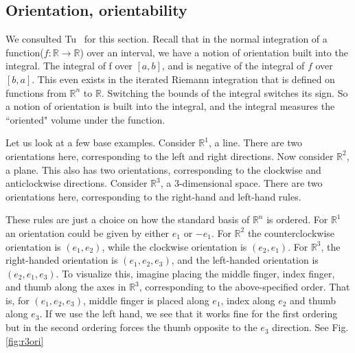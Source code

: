 \documentclass{article}
\theoremstyle{definition}
\theoremstyle{named}
\begin{document}
\subsection{Orientation, orientability}

We consulted Tu~\cite{tu2010introduction} for this section. Recall that in the normal integration of a function($f: \mathbb{R} \to \mathbb{R}$) over an interval, we have a notion of orientation built into the integral. The integral of f over $[a, b]$, and is negative of the integral of $f$ over $[b, a]$. This even exists in the iterated Riemann integration that is defined on functions from $\mathbb{R}^n$ to $\mathbb{R}$. Switching the bounds of the integral switches its sign. So a notion of orientation is built into the integral, and the integral measures the ``oriented" volume under the function.

Let us look at a few base examples. Consider $\mathbb{R}^1$, a line. There are two orientations here, corresponding to the left and right directions. Now consider $\mathbb{R}^2$, a plane. This also has two orientations, corresponding to the clockwise and anticlockwise directions. Consider $\mathbb{R}^3$, a 3-dimensional space. There are two orientations here, corresponding to the right-hand and left-hand rules. 

These rules are just a choice on how the standard basis of $\mathbb{R}^n$ is ordered. For $\mathbb{R}^1$ an orientation could be given by either $e_1$ or $-e_1$. For $\mathbb{R}^2$ the counterclockwise orientation is $(e_1, e_2)$, while the clockwise orientation is $(e_2, e_1)$. For $\mathbb{R}^3$, the right-handed orientation is $(e_1, e_2, e_3)$, and the left-handed orientation is $(e_2, e_1, e_3)$. To visualize this, imagine placing the middle finger, index finger, and thumb along the axes in $\mathbb{R}^3$, corresponding to the above-specified order. That is, for $(e_1, e_2, e_3)$, middle finger is placed along $e_1$, index along $e_2$ and thumb along $e_3$. If we use the left hand, we see that it works fine for the first ordering but in the second ordering forces the thumb opposite to the $e_3$ direction. See Fig.\ref{fig:r3ori}
\end{document}

